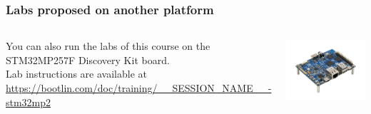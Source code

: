 \begin{frame}
\frametitle{Labs proposed on another platform}
  \begin{columns}
    You can also run the labs of this course on the STM32MP257F Discovery Kit board.\\
    \vspace{1em}
    Lab instructions are available at\\
    {\small \url{https://bootlin.com/doc/training/__SESSION_NAME__-stm32mp2}}
    \begin{center}
      \includegraphics[width=\textwidth]{../slides/stm32mp2-board-also-supported/STM32MP257F-DK.png}
    \end{center}
  \end{columns}
\end{frame}
